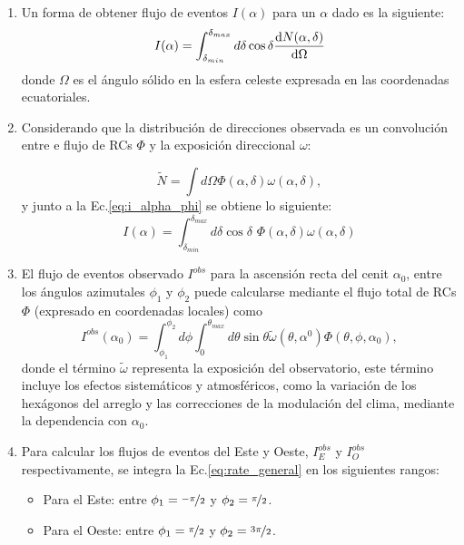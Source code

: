 \begin{enumerate}


    \item Un forma de obtener flujo de eventos $I(\alpha)$  para un $\alpha$ dado es la siguiente:
        \begin{equation}
            I(\alpha) = \int_{\delta_{min}}^{\delta_{max}} d\delta \cos \delta \dv{N(\alpha,\delta)}{\Omega}
            \label{eq:i_alpha_phi}
        \end{equation}
    \noindent donde $\Omega$ es el ángulo sólido en la esfera celeste expresada en las coordenadas ecuatoriales.

    \item Considerando que la distribución de direcciones observada es un convolución entre e flujo de RCs $\Phi$ y la exposición direccional $\omega$:
    
        \begin{equation}
            \tilde{N} = \int d\Omega \Phi(\alpha, \delta) \omega(\alpha, \delta),
            \label{eq:conv}
        \end{equation}
    \noindent y junto a la Ec.\ref{eq:i_alpha_phi}  se obtiene lo siguiente:
    \begin{equation}
        I(\alpha) =  \int_{\delta_{min}}^{\delta_{max}} d\delta \cos\delta \,\, \Phi(\alpha, \delta) \omega(\alpha, \delta)
        \label{eq:i_coor_ecua}
    \end{equation}
    

    
    

    \item El flujo de eventos observado $I^{obs}$ para la ascensión recta del cenit $\alpha_0$, entre los ángulos azimutales $\phi_1$ y $\phi_2$ puede calcularse mediante el flujo total de RCs $\Phi$ (expresado en coordenadas locales) como
    \begin{equation}
        I^{obs}(\alpha_0) = \int_{\phi_1}^{\phi_2} d\phi \int_{0}^{\theta_{max}} d\theta \sin\theta \tilde{\omega}(\theta, \alpha^0) \Phi(\theta, \phi, \alpha_0),
        \label{eq:rate_general}
    \end{equation}
    \noindent  donde  el término $\tilde{\omega}$ representa la exposición del observatorio, este término incluye los efectos sistemáticos y atmosféricos, como la variación de los hexágonos del arreglo y las correcciones de la modulación del clima, mediante  la dependencia con $\alpha_0$.

    \item Para calcular los flujos de eventos del Este y Oeste, $I^{obs}_E$ y $I_O^{obs}$ respectivamente, se integra la Ec.\ref{eq:rate_general} en los siguientes  rangos:
    \begin{itemize}
        \item Para el Este: entre $\phi_1=\nicefrac{-\pi}{2}$ y $\phi_2=\nicefrac{\pi}{2}$.
        \item Para el Oeste: entre $\phi_1=\nicefrac{\pi}{2}$ y $\phi_2=\nicefrac{3\pi}{2}$.
    \end{itemize}


\end{enumerate}
